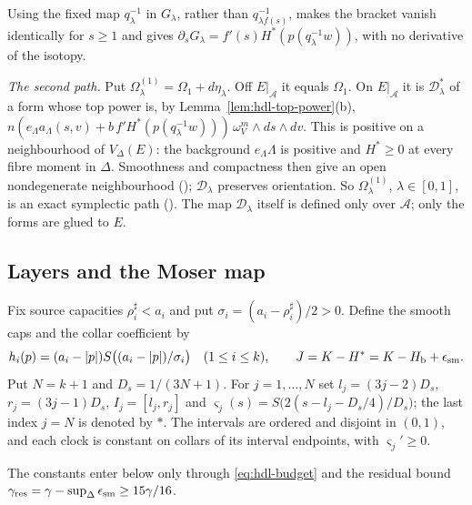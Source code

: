 Using the fixed map $q_\lambda^{-1}$ in $G_\lambda$, rather than $q_{\lambda f(s)}^{-1}$, makes the bracket vanish identically for
$s\ge1$ and gives $\partial_sG_\lambda=f'(s)H^*(p(q_\lambda^{-1}w))$, with no derivative of the isotopy.

\emph{The second path.} Put $\Omega^{(1)}_\lambda=\Omega_1+d\eta_\lambda$. Off $E|_{\mathcal A}$ it equals $\Omega_1$. On
$E|_{\mathcal A}$ it is $\mathcal D_\lambda^*$ of a form whose top power is, by Lemma~\ref{lem:hdl-top-power}(b),
$n(e_\Lambda a_\Lambda(s,v)+b\,f'H^*(p(q_\lambda^{-1}w)))\,\omega_V^m\wedge ds\wedge dv$. This is positive on a neighbourhood of $V_\Delta(E)$:
the background $e_\Lambda\Lambda$ is positive and $H^*\ge0$ at every fibre moment in $\Delta$. Smoothness and compactness then give an open nondegenerate neighbourhood (); $\mathcal D_\lambda$ preserves orientation. So $\Omega^{(1)}_\lambda$, $\lambda\in[0,1]$, is an
exact symplectic path (). The map $\mathcal D_\lambda$ itself is defined only over
$\mathcal A$; only the forms are glued to $E$.

\subsection{Layers and the Moser map}\label{sec:hdl-layers}

Fix source capacities $\rho_i^\sharp<a_i$ and put $\sigma_i=(a_i-\rho_i^\sharp)/2>0$.
Define the smooth caps and the collar coefficient by
\begin{equation}\label{eq:hdl-caps}
 h_i(p)=(a_i-|p|)S\big((a_i-|p|)/\sigma_i\big)\quad(1\le i\le k),\qquad
 J=K-H^*=K-H_{\mathrm b}+\epsilon_{\rm sm} .
\end{equation}
Put $N=k+1$ and $D_s=1/(3N+1)$. For $j=1,\dots,N$ set
$l_j=(3j-2)D_s$, $r_j=(3j-1)D_s$, $I_j=[l_j,r_j]$ and
$\varsigma_j(s)=S\big(2(s-l_j-D_s/4)/D_s\big)$; the last index $j=N$ is denoted by $*$.
The intervals are ordered and disjoint in $(0,1)$, and each clock is constant on collars
of its interval endpoints, with $\varsigma_j'\ge0$.

The constants enter below only through \eqref{eq:hdl-budget} and the residual bound
$\gamma_{\rm res}=\gamma-\sup_\Delta\epsilon_{\rm sm}\ge15\gamma/16$.

